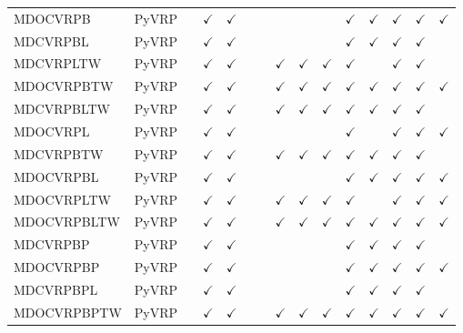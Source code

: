 \documentclass{article}
\theoremstyle{plain}
\theoremstyle{definition}
\theoremstyle{remark}
\begin{document}
\begin{table}[h!]
{\begin{tabular}{l|l|cc|cccccc|ccccc}
    MDOCVRPB &PyVRP    & & $\checkmark$ & $\checkmark$ & & & & & & $\checkmark$ & $\checkmark$ & $\checkmark$ & $\checkmark$ & $\checkmark$ \\
    MDCVRPBL &PyVRP    & & $\checkmark$ & $\checkmark$ & & & & & & $\checkmark$ & $\checkmark$ & $\checkmark$ & $\checkmark$ & \\
    MDCVRPLTW &PyVRP   & & $\checkmark$ & $\checkmark$ & & & $\checkmark$ & $\checkmark$ & $\checkmark$ & $\checkmark$ & & $\checkmark$ & $\checkmark$ & \\
    MDOCVRPBTW &PyVRP  & & $\checkmark$ & $\checkmark$ & & & $\checkmark$ & $\checkmark$ & $\checkmark$ & $\checkmark$ & $\checkmark$ & $\checkmark$ & $\checkmark$ & $\checkmark$ \\
    MDCVRPBLTW &PyVRP  & & $\checkmark$ & $\checkmark$ & & & $\checkmark$ & $\checkmark$ & $\checkmark$ & $\checkmark$ & $\checkmark$ & $\checkmark$ & $\checkmark$ & \\
    MDOCVRPL &PyVRP    & & $\checkmark$ & $\checkmark$ & & & & & & $\checkmark$ & & $\checkmark$ & $\checkmark$ & $\checkmark$ \\
    MDCVRPBTW&PyVRP    & & $\checkmark$ & $\checkmark$ & & & $\checkmark$ & $\checkmark$ & $\checkmark$ & $\checkmark$ & $\checkmark$ & $\checkmark$ & $\checkmark$ & \\
    MDOCVRPBL &PyVRP   & & $\checkmark$ & $\checkmark$ & & & & & & $\checkmark$ & $\checkmark$ & $\checkmark$ & $\checkmark$ & $\checkmark$ \\
    MDOCVRPLTW &PyVRP  & & $\checkmark$ & $\checkmark$ & & & $\checkmark$ & $\checkmark$ & $\checkmark$ & $\checkmark$ & & $\checkmark$ & $\checkmark$ & $\checkmark$ \\
    MDOCVRPBLTW&PyVRP  & & $\checkmark$ & $\checkmark$ & & & $\checkmark$ & $\checkmark$ & $\checkmark$ & $\checkmark$ & $\checkmark$ & $\checkmark$ & $\checkmark$ & $\checkmark$ \\
    MDCVRPBP &PyVRP    & & $\checkmark$ & $\checkmark$ & & & & & & $\checkmark$ & $\checkmark$ & $\checkmark$ & $\checkmark$ & \\
    MDOCVRPBP&PyVRP    & & $\checkmark$ & $\checkmark$ & & & & & & $\checkmark$ & $\checkmark$ & $\checkmark$ & $\checkmark$ & $\checkmark$ \\
    MDCVRPBPL &PyVRP   & & $\checkmark$ & $\checkmark$ & & & & & & $\checkmark$ & $\checkmark$ & $\checkmark$ & $\checkmark$ & \\
    MDOCVRPBPTW&PyVRP  & & $\checkmark$ & $\checkmark$ & & & $\checkmark$ & $\checkmark$ & $\checkmark$ & $\checkmark$ & $\checkmark$ & $\checkmark$ & $\checkmark$ & $\checkmark$ \\

\end{tabular}}
\end{table}
\end{document}
